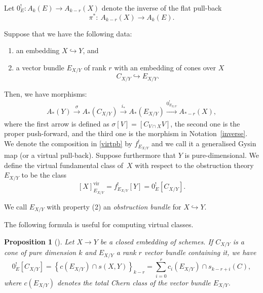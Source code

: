 \documentclass[pdftex]{sigma}
\numberwithin{equation}{section}
\newtheorem{Proposition}[Theorem]{Proposition}
 { \theoremstyle{definition}
\newtheorem{Definition}[Theorem]{Definition}
\newtheorem{Note}[Theorem]{Note}
\newtheorem{Example}[Theorem]{Example}
\newtheorem{Remark}[Theorem]{Remark}
\newtheorem{notation}[Theorem]{Notation}
\newtheorem{construction}[Theorem]{Construction}
}
\newcommand{\vv}{\mathrm{vir}}
\begin{document}
\begin{notation} \label{inverse} Let $0_E^!\colon A_k(E)\to A_{k-r}(X)$ denote the inverse of the flat pull-back
\[\pi^*\colon \ A_{k-r}(X)\to A_k(E).
\]
\end{notation}
\begin{construction}\label{naive}
Suppose that we have the following data:
\begin{enumerate}\itemsep=0pt
\item[1)] an embedding $X\hookrightarrow Y$, and
\item[2)] a vector bundle $E_{X/Y}$ of rank $r$ with an embedding of cones over $X$
 \begin{equation*}C_{X/Y}\hookrightarrow E_{X/Y}.
 \end{equation*}
\end{enumerate}
 Then, we have morphisms:
\begin{align}\label{virtpb}
A_*(Y)\xrightarrow{\sigma} A_*(C_{X/Y})\xrightarrow{i_*} A_*(E_{X/Y})\xrightarrow{0_{E_{X/Y}}^!} A_{*-r}(X),
\end{align}
where the first arrow is defined as $\sigma[V]=[C_{V\cap X} V]$, the second one is the proper push-forward, and the third one is the morphism in Notation~\ref{inverse}. We denote the composition in \eqref{virtpb} by $f^!_{E_{X/Y}}$ and we call it a generalised Gysin map (or a virtual pull-back). Suppose furthermore that $Y$ is pure-dimensional. We define the virtual fundamental class of~$X$ with respect to the obstruction theory $E_{X/Y}$ to be the class
\[[X]_{E_{X/Y}}^{\vv}=f^!_{E_{X/Y}}[Y]=0^!_E[C_{X/Y}].\]
\end{construction}
\begin{Definition}We call $E_{X/Y}$ with property (2) an \emph{obstruction bundle} for $X\hookrightarrow Y$.
\end{Definition}
The following formula is useful for computing virtual classes.
\begin{Proposition}[{\cite[Example~4.1.8]{Fulton}}]\label{prop:zerocone}
Let $X\to Y$ be a closed embedding of schemes. If $C_{X/Y}$ is a cone of pure dimension $k$ and $E_{X/Y}$ a rank $r$ vector bundle containing it, we have
\begin{equation}\label{segrechern}0^!_E[C_{X/Y}]=\left\{c(E_{X/Y})\cap s(X,Y)\right\}_{k-r}=\sum_{i=0}^r{c_i(E_{X/Y})\cap s_{k-r+i}(C)},
\end{equation}
where $c(E_{X/Y})$ denotes the total Chern class of the vector bundle $E_{X/Y}$.
\end{Proposition}
\end{document}
